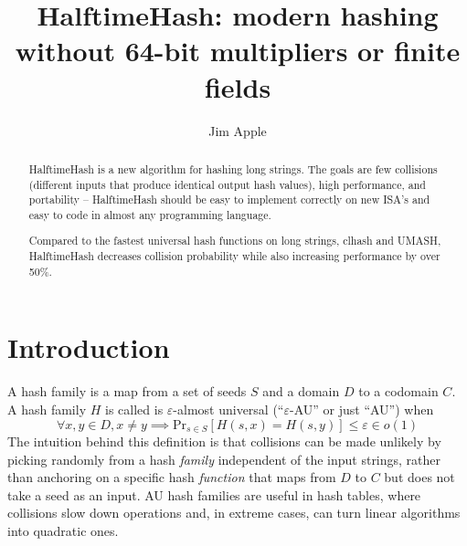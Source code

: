 \documentclass[runningheads]{llncs}
\begin{document}
\title{HalftimeHash: modern hashing without 64-bit multipliers or finite fields}
\author{Jim Apple
}


\maketitle


\begin{abstract}
HalftimeHash is a new algorithm for hashing long strings.
The goals are few collisions (different inputs that produce identical output hash values), high performance, and portability -- HalftimeHash should be easy to implement correctly on new ISA's and easy to code in almost any programming language.

Compared to the fastest universal hash functions on long strings, clhash and UMASH, HalftimeHash decreases collision probability while also increasing performance by over 50\%.

\end{abstract}

\section{Introduction}
A hash family is a map from a set of seeds $S$ and a domain $D$ to a codomain $C$.
A hash family $H$ is called is $\varepsilon$-almost universal (``$\varepsilon$-AU'' or just ``AU'') when
\[
\forall x,y \in D, x \neq y \implies \mathrm{Pr}_{s \in S}[H(s, x) = H(s, y)] \leq \varepsilon \in o(1)
\]
The intuition behind this definition is that collisions can be made unlikely by picking randomly from a hash {\em family} independent of the input strings, rather than anchoring on a specific hash {\em function} that maps from $D$ to $C$ but does not take a seed as an input. AU hash families are useful in hash tables, where collisions slow down operations and, in extreme cases, can turn linear algorithms into quadratic ones. \cite{tabulation,rust-quadratic,impala-quadratic,algorithm-attack}
\end{document}
